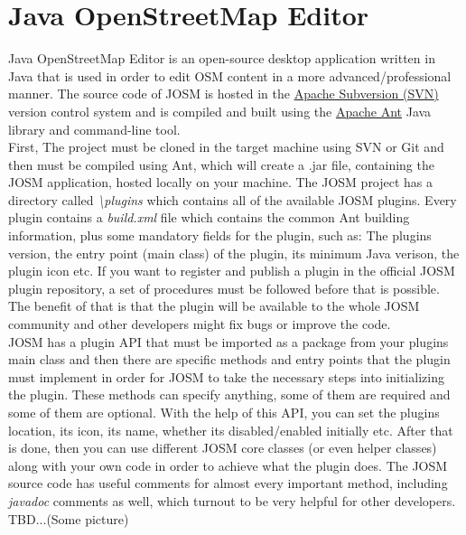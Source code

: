 \section{Java OpenStreetMap Editor}
Java OpenStreetMap Editor is an open-source desktop application written in Java that is used in order to edit OSM content in a more advanced/professional manner. The source code of JOSM is hosted in the \href{https://subversion.apache.org/}{Apache Subversion (SVN)} version control system and is compiled and built using the \href{https://ant.apache.org/}{Apache Ant} Java library and command-line tool.\\
\newline
First, The project must be cloned in the target machine using SVN or Git and then must be compiled using Ant, which will create a .jar file, containing the JOSM application, hosted locally on your machine. The JOSM project has a directory called \textit{\textbackslash plugins} which contains all of the available JOSM plugins. Every plugin contains a \textit{build.xml} file which contains the common Ant building information, plus some mandatory fields for the plugin, such as: The plugins version, the entry point (main class) of the plugin, its minimum Java verison, the plugin icon etc. If you want to register and publish a plugin in the official JOSM plugin repository, a set of procedures must be followed before that is possible. The benefit of that is that the plugin will be available to the whole JOSM community and other developers might fix bugs or improve the code.\\
\newline
JOSM has a plugin API that must be imported as a package from your plugins main class and then there are specific methods and entry points that the plugin must implement in order for JOSM to take the necessary steps into initializing the plugin. These methods can specify anything, some of them are required and some of them are optional.
With the help of this API, you can set the plugins location, its icon, its name, whether its disabled/enabled initially etc. After that is done, then you can use different JOSM core classes (or even helper classes) along with your own code in order to achieve what the plugin does. The JOSM source code has useful comments for almost every important method, including \textit{javadoc} comments as well, which turnout to be very helpful for other developers.
TBD...(Some picture)
